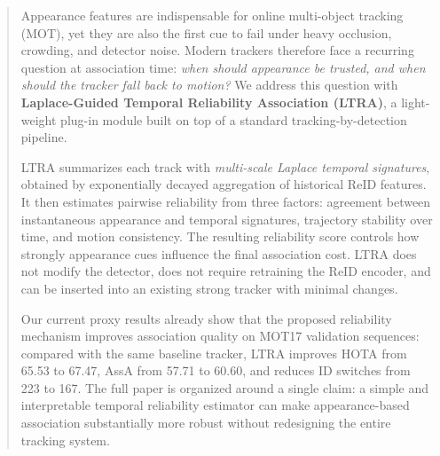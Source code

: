 \begin{abstract}
Appearance features are indispensable for online multi-object tracking (MOT), yet they are also the first cue to fail under heavy occlusion, crowding, and detector noise. Modern trackers therefore face a recurring question at association time: \emph{when should appearance be trusted, and when should the tracker fall back to motion?} We address this question with \textbf{Laplace-Guided Temporal Reliability Association (LTRA)}, a light-weight plug-in module built on top of a standard tracking-by-detection pipeline.

LTRA summarizes each track with \emph{multi-scale Laplace temporal signatures}, obtained by exponentially decayed aggregation of historical ReID features. It then estimates pairwise reliability from three factors: agreement between instantaneous appearance and temporal signatures, trajectory stability over time, and motion consistency. The resulting reliability score controls how strongly appearance cues influence the final association cost. LTRA does not modify the detector, does not require retraining the ReID encoder, and can be inserted into an existing strong tracker with minimal changes.

Our current proxy results already show that the proposed reliability mechanism improves association quality on MOT17 validation sequences: compared with the same baseline tracker, LTRA improves HOTA from 65.53 to 67.47, AssA from 57.71 to 60.60, and reduces ID switches from 223 to 167. The full paper is organized around a single claim: a simple and interpretable temporal reliability estimator can make appearance-based association substantially more robust without redesigning the entire tracking system.
\end{abstract}
